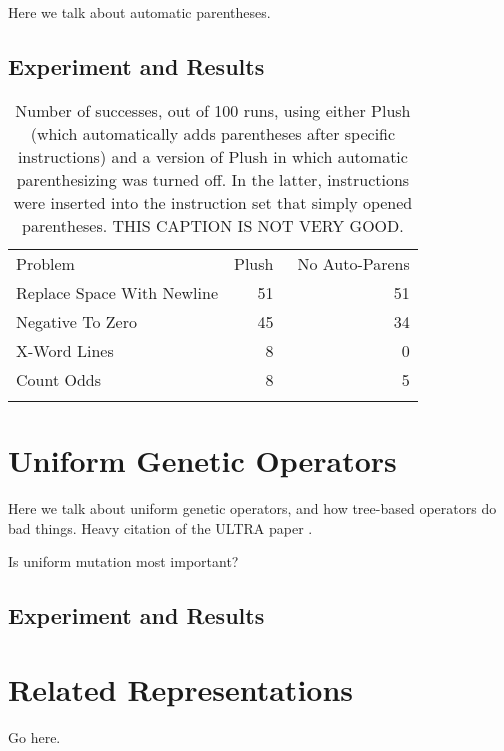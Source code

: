 Here we talk about automatic parentheses.


\subsection{Experiment and Results}


\begin{table}
\centering
\caption{Number of successes, out of 100 runs, using either Plush (which automatically adds parentheses after specific instructions) and a version of Plush in which automatic parenthesizing was turned off. In the latter, instructions were inserted into the instruction set that simply opened parentheses. THIS CAPTION IS NOT VERY GOOD.}
\label{no-auto-parens-experiment}       %
%
%
\begin{tabular}{l r r}
\hline\noalign{\smallskip}
Problem                    & Plush & ~No Auto-Parens \\
\noalign{\smallskip}\svhline\noalign{\smallskip}
Replace Space With Newline &  51 & 51 \\
Negative To Zero           &  45 & 34 \\
X-Word Lines               &   8 &  0 \\
Count Odds                 &   8 &  5 \\
\noalign{\smallskip}\hline\noalign{\smallskip}
\end{tabular}

\end{table}

\section{Uniform Genetic Operators}

Here we talk about uniform genetic operators, and how tree-based operators do bad things. Heavy citation of the ULTRA paper \citep{Spector:2013:GPTP}.

Is uniform mutation most important?


\subsection{Experiment and Results}





\section{Related Representations}







\begin{acknowledgement}
Go here.
\end{acknowledgement}
%




